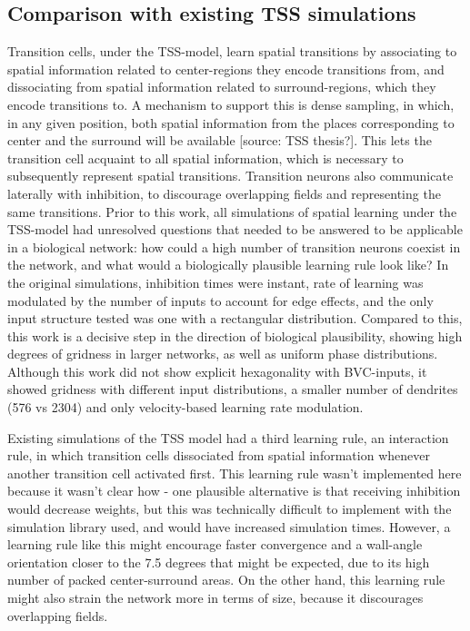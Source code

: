 \documentclass{article}
\begin{document}
    \subsection{Comparison with existing TSS simulations}

    Transition cells, under the TSS-model, learn spatial transitions by associating to spatial information related to center-regions they encode transitions from, and dissociating from spatial information related to surround-regions, which they encode transitions to. A mechanism to support this is dense sampling, in which, in any given position, both spatial information from the places corresponding to center and the surround will be available [source: TSS thesis?]. This lets the transition cell acquaint to all spatial information, which is necessary to subsequently represent spatial transitions. Transition neurons also communicate laterally with inhibition, to discourage overlapping fields and representing the same transitions. 
    Prior to this work, all simulations of spatial learning under the TSS-model had unresolved questions that needed to be answered to be applicable in a biological network: how could a high number of transition neurons coexist in the network, and what would a biologically plausible learning rule look like? In the original simulations, inhibition times were instant, rate of learning was modulated by the number of inputs to account for edge effects, and the only input structure tested was one with a rectangular distribution.
    Compared to this, this work is a decisive step in the direction of biological plausibility, showing high degrees of gridness in larger networks, as well as uniform phase distributions. Although this work did not show explicit hexagonality with BVC-inputs, it showed gridness with different input distributions, a smaller number of dendrites (576 vs 2304) and only velocity-based learning rate modulation.

    Existing simulations of the TSS model had a third learning rule, an interaction rule, in which transition cells dissociated from spatial information whenever another transition cell activated first. This learning rule wasn't implemented here because it wasn't clear how - one plausible alternative is that receiving inhibition would decrease weights, but this was technically difficult to implement with the simulation library used, and would have increased simulation times. However, a learning rule like this might encourage faster convergence and a wall-angle orientation closer to the 7.5 degrees that might be expected, due to its high number of packed center-surround areas. On the other hand, this learning rule might also strain the network more in terms of size, because it discourages overlapping fields.
\end{document}
